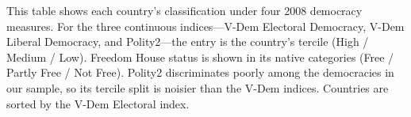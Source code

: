 \documentclass[11pt]{article}
\let\mathbetasym\beta
\renewcommand{\beta}{\ensuremath{\mathbetasym}}
\begin{document}
\begin{table}[htb!]
    \caption{Country democracy classification across four indices.}
    \label{tab:sup_democracy_index_ranks}
    \begin{center}
        \small{}
    \end{center}
    \footnotesize{This table shows each country's classification under four 2008 democracy measures. For the three continuous indices---V-Dem Electoral Democracy, V-Dem Liberal Democracy, and Polity2---the entry is the country's tercile (High / Medium / Low). Freedom House status is shown in its native categories (Free / Partly Free / Not Free). Polity2 discriminates poorly among the democracies in our sample, so its tercile split is noisier than the V-Dem indices. Countries are sorted by the V-Dem Electoral index.}
\end{table}

\end{document}
